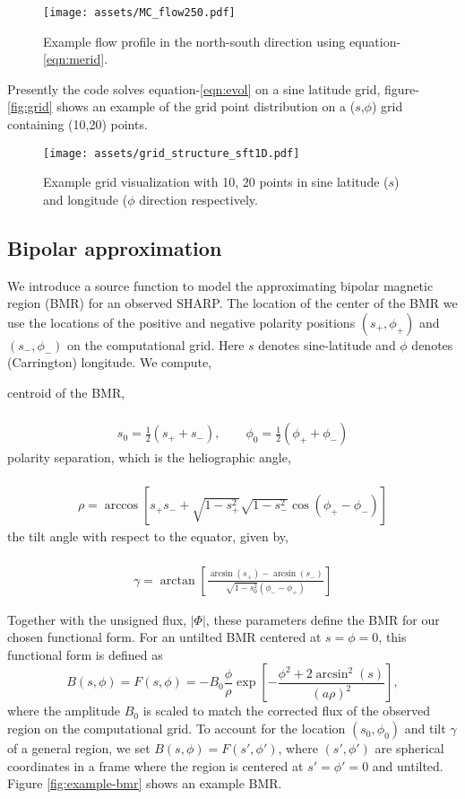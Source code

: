 \documentclass[twoside,12pt]{book}
\begin{document}
\begin{figure}
    \centering
    \texttt{[image: assets/MC\_flow250.pdf]}
    \caption{Example flow profile in the north-south direction using equation-\ref{eqn:merid}.}
\end{figure}
Presently the code solves equation-\ref{eqn:evol} on a sine latitude grid, figure-\ref{fig:grid} shows an example of the grid point distribution on a ($s$,$\phi$) grid containing (10,20) points.
\begin{figure}[htbp]
    \centering
    \texttt{[image: assets/grid\_structure\_sft1D.pdf]}
    \caption{Example grid visualization with 10, 20 points in sine latitude ($s$) and longitude ($\phi$ direction respectively.}
\end{figure}
\subsection{Bipolar approximation}
We introduce a source function to model the approximating bipolar magnetic region (BMR) for an observed SHARP. The location of the center of the BMR we use the locations of the positive and negative polarity positions $(s_+, \phi_+)$ and $(s_-,\phi_-)$ on the computational grid. Here $s$ denotes sine-latitude and $\phi$ denotes (Carrington) longitude. We compute,
\begin{itemize}
    \Item centroid of the BMR,\\ \\ \begin{align}
    s_0 = \frac12(s_+ + s_-),\qquad \phi_0 = \frac12(\phi_+ + \phi_-)
    \end {align}
    \Item polarity separation, which is the heliographic angle,\\ \\ \begin{align}
    \rho = \arccos\left[s_+s_- + \sqrt{1-s_+^2}\sqrt{1 - s_-^2}\cos(\phi_+-\phi_-) \right]
    \end {align}
    \Item the tilt angle with respect to the equator, given by,\\ \\ \begin{align}
    \gamma = \arctan\left[\frac{\arcsin(s_+) - \arcsin(s_-)}{\sqrt{1-s_0^2}(\phi_- - \phi_+)}\right]
    \end {align}
\end{itemize}


Together with the unsigned flux, $|\Phi|$, these parameters define the BMR for our chosen functional form. For an untilted BMR centered at $s=\phi=0$, this functional form is defined as
\begin{equation}
B(s,\phi) = F(s,\phi) = -B_0\frac{\phi}{\rho}\exp\left[-\frac{\phi^2 + 2\arcsin^2(s)}{(a\rho)^2}\right],
\end{equation}
where the amplitude $B_0$ is scaled to match the corrected flux of the observed region on the computational grid. To account for the location $(s_0,\phi_0)$ and tilt $\gamma$ of a general region, we set $B(s,\phi) = F(s',\phi')$, where $(s',\phi')$ are spherical coordinates in a frame where the region is centered at $s'=\phi'=0$ and untilted. Figure \ref{fig:example-bmr} shows an example BMR.
\end{document}

